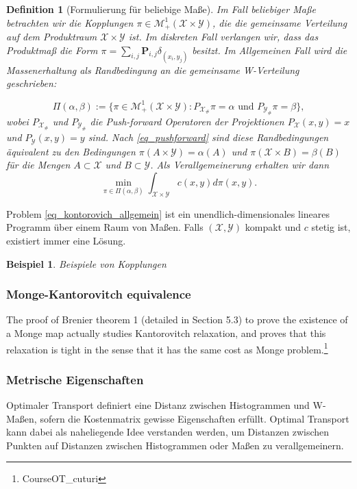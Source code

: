 \documentclass[twoside, 11pt,a4paper]{article}
\newtheorem{definition}[theorem]{Definition}
\newtheorem{example}[theorem]{Beispiel}
\numberwithin{equation}{section}
\begin{document}
	\begin{definition}[Formulierung für beliebige Maße]
		Im Fall beliebiger Maße betrachten wir die Kopplungen $\pi \in \mathcal{M}_+^1(\mathcal{X} \times \mathcal{Y})$, die die gemeinsame Verteilung auf dem Produktraum $\mathcal{X} \times \mathcal{Y}$ ist. Im diskreten Fall verlangen wir, dass das Produktmaß die Form $ \pi = \sum_{i,j}{\boldsymbol{P}_{i,j}\delta_{(x_i, y_j)}}$ besitzt. Im Allgemeinen Fall wird die Massenerhaltung als Randbedingung an die gemeinsame W-Verteilung geschrieben:
		
		\begin{equation}
		\Pi(\alpha, \beta) := \lbrace \pi \in \mathcal{M}_+^1(\mathcal{X} \times \mathcal{Y}): P_{\mathcal{X}_\#} \pi = \alpha \text{ und } P_{\mathcal{Y}_\#} \pi = \beta \rbrace,
		\end{equation}
		wobei $P_{\mathcal{X}_\#}$ und $P_{\mathcal{Y}_\#}$ die Push-forward Operatoren der Projektionen $P_\mathcal{X}(x,y) = x$ und $P_\mathcal{Y}(x,y) = y$ sind. Nach \autoref{eq_pushforward} sind diese Randbedingungen äquivalent zu den Bedingungen $\pi(A \times \mathcal{Y}) = \alpha (A)$ und $\pi (\mathcal{X} \times B) = \beta (B)$ für die Mengen $A \subset \mathcal{X}$ und $B \subset \mathcal{Y}$.
		Als Verallgemeinerung erhalten wir dann
		\begin{equation}
		\min_{\pi \in \Pi (\alpha, \beta)}\int_{\mathcal{X} \times \mathcal{Y}}{c(x,y) d\pi (x,y)}. \label{eq_kontorovich_allgemein}
		\end{equation}
	\end{definition}
	
	Problem \autoref{eq_kontorovich_allgemein} ist ein unendlich-dimensionales lineares Programm über einem Raum von Maßen. Falls $(\mathcal{X}, \mathcal{Y})$ kompakt und $c$ stetig ist, existiert immer eine Lösung.
	
	\begin{example}
		Beispiele von Kopplungen
	\end{example} 
	\subsubsection{Monge-Kantorovitch equivalence}
	The proof of Brenier theorem 1 (detailed in Section 5.3) to prove
	the existence of a Monge map actually studies Kantorovitch relaxation, and proves that this relaxation is
	tight in the sense that it has the same cost as Monge problem.\footnote{CourseOT\_cuturi}
	\subsubsection{Metrische Eigenschaften}
	Optimaler Transport definiert eine Distanz zwischen Histogrammen und W-Maßen, sofern die Kostenmatrix gewisse Eigenschaften erfüllt. Optimal Transport kann dabei als naheliegende Idee verstanden werden, um Distanzen zwischen Punkten auf Distanzen zwischen Histogrammen oder Maßen zu verallgemeinern.
	
\end{document}
